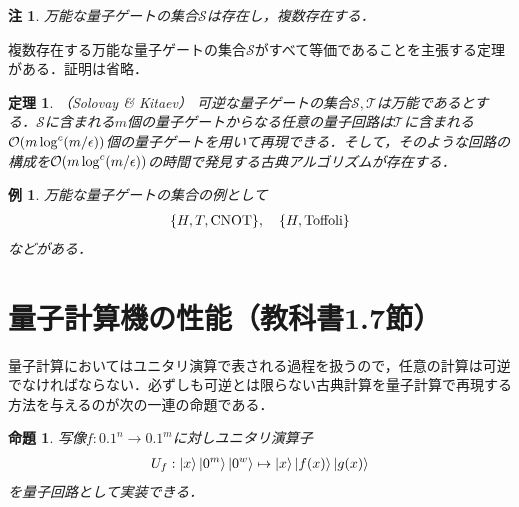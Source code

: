 \documentclass[dvipdfmx]{jarticle}
\numberwithin{equation}{section}
\theoremstyle{seminar}
\newtheorem{theorem}{定理}[section]
\newtheorem{proposition}{命題}[section]
\newtheorem{example}{例}[section]
\newtheorem{remark}{注}[section]
\begin{document}
\begin{remark}
  万能な量子ゲートの集合$\mathcal{S}$は存在し，複数存在する．
\end{remark}

複数存在する万能な量子ゲートの集合$\mathcal{S}$がすべて等価であることを主張する定理がある．証明は省略．
\begin{theorem}（Solovay \& Kitaev）
  可逆な量子ゲートの集合$\mathcal{S}, \mathcal{T}$は万能であるとする．$\mathcal{S}$に含まれる$m$個の量子ゲートからなる任意の量子回路は$\mathcal{T}$に含まれる$\mathcal{O}\qty(m \log^c (m / \epsilon))$個の量子ゲートを用いて再現できる．そして，そのような回路の構成を$\mathcal{O}\qty(m \log^c (m / \epsilon))$の時間で発見する古典アルゴリズムが存在する．
\end{theorem}

\begin{example}
  万能な量子ゲートの集合の例として
  \begin{align}
    \qty{H, T, \mathrm{CNOT}}, \quad \qty{H, \mathrm{Toffoli}}
  \end{align}
  などがある．
\end{example}

\section{量子計算機の性能（教科書1.7節）}
量子計算においてはユニタリ演算で表される過程を扱うので，任意の計算は可逆でなければならない．必ずしも可逆とは限らない古典計算を量子計算で再現する方法を与えるのが次の一連の命題である．
\begin{proposition}
  写像$f: \qty{0, 1}^n \rightarrow \qty{0, 1}^m$に対しユニタリ演算子
  \begin{align}
    U_f: \ket{x}\ket{0^m}\ket{0^w} \mapsto \ket{x}\ket{f(x)}\ket{g(x)} \label{unitaryop}
  \end{align}
  を量子回路として実装できる．
\end{proposition}
\end{document}
